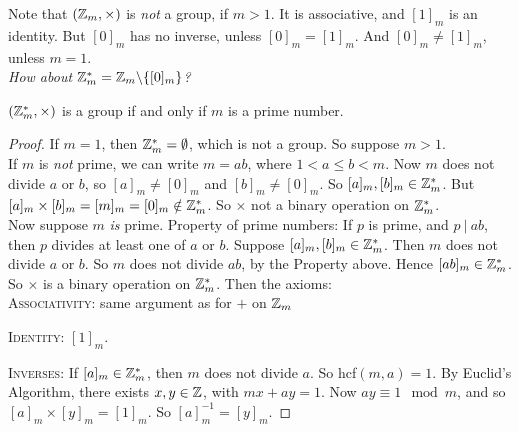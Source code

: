 Note that $(\mathbb{Z}_m,\times)$ is \emph{not} a group, if $m > 1$. It is associative, and $[1]_m$ is an identity. But $[0]_m$ has no inverse, unless $[0]_m = [1]_m$. And $[0]_m \neq [1]_m$, unless $m =1 $.\\

\textit{How about $\mathbb{Z}^{*}_m = \mathbb{Z}_m \backslash\{[0]_m\}$?}\\

\begin{proposition}$(\mathbb{Z}_m^{*},\times)$ is a group if and only if $m$ is a prime number.	
\end{proposition}


\begin{proof}
If $m = 1$, then $\mathbb{Z}_m^* = \emptyset$, which is not a group. So suppose $m > 1$.\\ If $m$ is \emph{not} prime, we can write $m = ab$, where $1 < a \leq b < m$. Now $m$ does not divide $a$ or $b$, so $[a]_m \neq [0]_m$ and $[b]_m \neq [0]_m$. So $[a]_m, [b]_m \in \mathbb{Z}_m^*$. But $[a]_m \times [b]_m = [m]_m = [0]_m \notin \mathbb{Z}_m^*$. So $\times$ not a binary operation on $\mathbb{Z}_m^*$. \\

Now suppose $m$ \emph{is} prime. Property of prime numbers: If $p$ is prime, and $p ~|~ ab$, then $p$ divides at least one of $a$ or $b$. Suppose $[a]_m,[b]_m \in \mathbb{Z}_m^*$. Then $m$ does not divide $a$ or $b$. So $m$ does not divide $ab$, by the Property above. Hence $[ab]_m \in \mathbb{Z}_m^*$. So $\times$ is a binary operation on $\mathbb{Z}_m^*$. Then the axioms:\\

\textsc{Associativity:} same argument as for $+$ on $\mathbb{Z}_m$\\ \vspace*{-10pt}

\textsc{Identity:} $[1]_m$.\\ \vspace*{-10pt}

\textsc{Inverses:} If $[a]_m \in \mathbb{Z}_m^*$, then $m$ does not divide $a$. So hcf$(m,a)= 1$. By Euclid's Algorithm, there exists $x,y \in \mathbb{Z}$, with $mx + ay = 1$. Now $ay \equiv 1 \mod m$, and so $[a]_m\times [y]_m = [1]_m$. So $[a]_m^{-1} = [y]_m$.
\end{proof}\vspace*{10pt}


